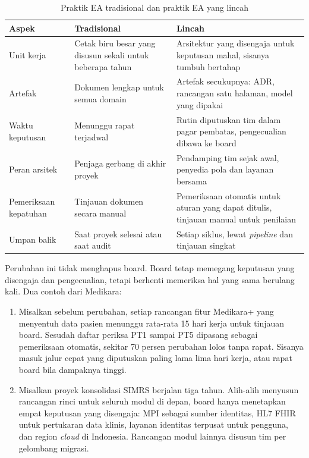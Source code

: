 \begin{table}[!htb]
  \centering
  \caption{Praktik EA tradisional dan praktik EA yang lincah}
  \label{tab:ch14-tradisional-lincah}
  \begin{tabularx}{\textwidth}{>{\raggedright\arraybackslash}p{2.2cm}>{\raggedright\arraybackslash}X>{\raggedright\arraybackslash}X}
    \hline
    \textbf{Aspek} & \textbf{Tradisional} & \textbf{Lincah} \\
    \hline
    Unit kerja & Cetak biru besar yang disusun sekali untuk beberapa tahun &
      Arsitektur yang disengaja untuk keputusan mahal, sisanya tumbuh
      bertahap \\
    \hline
    Artefak & Dokumen lengkap untuk semua domain & Artefak secukupnya: ADR,
      rancangan satu halaman, model yang dipakai \\
    \hline
    Waktu keputusan & Menunggu rapat terjadwal & Rutin diputuskan tim dalam
      pagar pembatas, pengecualian dibawa ke board \\
    \hline
    Peran arsitek & Penjaga gerbang di akhir proyek & Pendamping tim sejak
      awal, penyedia pola dan layanan bersama \\
    \hline
    Pemeriksaan kepatuhan & Tinjauan dokumen secara manual & Pemeriksaan
      otomatis untuk aturan yang dapat ditulis, tinjauan manual untuk
      penilaian \\
    \hline
    Umpan balik & Saat proyek selesai atau saat audit & Setiap siklus,
      lewat \textit{pipeline} dan tinjauan singkat \\
    \hline
  \end{tabularx}
\end{table}

Perubahan ini tidak menghapus board. Board tetap memegang keputusan yang
disengaja dan pengecualian, tetapi berhenti memeriksa hal yang sama
berulang kali. Dua contoh dari Medikara:

\begin{enumerate}
  \item Misalkan sebelum perubahan, setiap rancangan fitur Medikara+ yang
        menyentuh data pasien menunggu rata-rata 15 hari kerja untuk
        tinjauan board. Sesudah daftar periksa PT1 sampai PT5 dipasang
        sebagai pemeriksaan otomatis, sekitar 70 persen perubahan lolos
        tanpa rapat. Sisanya masuk jalur cepat yang diputuskan paling lama
        lima hari kerja, atau rapat board bila dampaknya tinggi.
  \item Misalkan proyek konsolidasi SIMRS berjalan tiga tahun. Alih-alih
        menyusun rancangan rinci untuk seluruh modul di depan, board hanya
        menetapkan empat keputusan yang disengaja: MPI sebagai sumber
        identitas, HL7 FHIR untuk pertukaran data klinis, layanan identitas
        terpusat untuk pengguna, dan region \textit{cloud} di Indonesia.
        Rancangan modul lainnya disusun tim per gelombang migrasi.
\end{enumerate}

